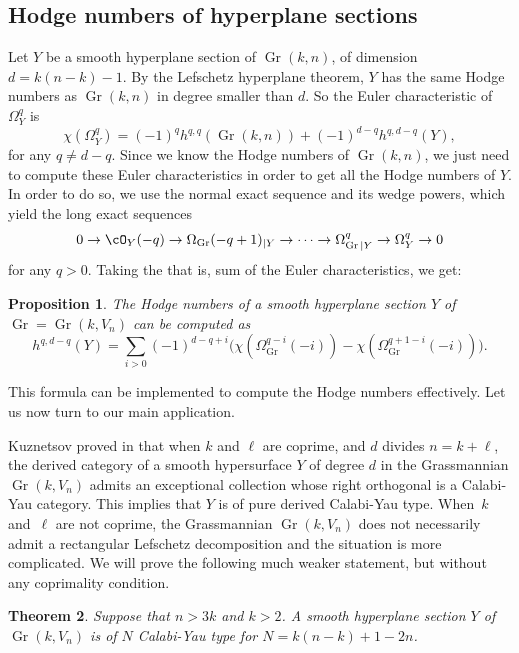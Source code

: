 \documentclass[JEP,XML,SOM,Unicode,NoEqCountersInSection]{cedram}
\theoremstyle{plain}
\newtheorem{theorem}{Theorem}\newtheorem*{theorem*}{Theorem}
\newtheorem{prop}[theorem]{Proposition}
\theoremstyle{definition}
\DeclareMathOperator{\Gr}{Gr}
\begin{document}
\subsection{Hodge numbers of hyperplane sections}\label{HG}
Let $Y$ be a smooth hyperplane section of $\Gr(k,n)$, of dimension $d=k(n-k)-1$.
By the Lefschetz hyperplane
theorem, $Y$ has the same Hodge numbers as $\Gr(k,n)$ in degree smaller than $d$. So
the Euler characteristic of $\Omega^q_{Y}$ is
\[
\chi(\Omega^q_{Y})=(-1)^qh^{q,q}(\Gr(k,n))+(-1)^{d-q}h^{q,d-q}(Y),
\]
for any $q\ne d-q$. Since we know the Hodge numbers of $\Gr(k,n)$, we just need to compute these
Euler characteristics in order to get all the Hodge numbers of $Y$. In order to
do so, we use the normal exact sequence and
its wedge powers, which yield the long exact sequences
\[
0\to\cO_Y(-q)\to \Omega_{\Gr}(-q+1)_{|Y}\to\cdots\to \Omega^q_{\Gr |Y}\to\Omega^q_{Y}\to 0
\]
for any $q>0$. Taking the that is,  sum of the Euler characteristics, we get:

\begin{prop}\label{hodgenumbers}
The Hodge numbers of a smooth hyperplane section $Y$ of $\Gr=\Gr(k,V_n)$ can be
computed as
\begin{equation*}
h^{q,d-q}(Y) = \sum_{i>0}(-1)^{d-q+i}\bigl(
\chi (\Omega_{\Gr}^{q-i}(-i))-\chi(\Omega_{\Gr}^{q+1-i}(-i))\bigr).
\end{equation*}
\end{prop}

This formula can be implemented to compute the Hodge numbers effectively.
Let us now turn to our main application.

Kuznetsov proved in \cite[Cor.\,4.4]{kuz-fractional} that when $k$ and $\ell$ are
coprime, and $d$ divides $n=k+\ell$, the derived category of a smooth hypersurface $Y$
of degree $d$ in the Grassmannian $\Gr(k,V_n)$ admits an exceptional collection whose
right orthogonal is a Calabi-Yau category. This implies that $Y$ is of pure derived Calabi-Yau type. When~$k$ and~$\ell$ are not coprime,
the Grassmannian $\Gr(k,V_n)$ does not necessarily admit a rectangular Lefschetz decomposition
and the situation is more complicated. We will prove the following much weaker statement,
but without any coprimality condition.

\begin{theorem}\label{thm:sect-of-G}
Suppose that $n>3k$ and $k>2$. A smooth hyperplane section $Y$ of $\Gr(k,V_n)$ is of $N$ Calabi-Yau type for $N=k(n-k)+1-2n$.
\end{theorem}
\end{document}
